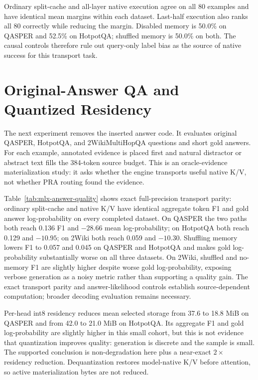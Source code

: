 \documentclass[10pt]{article}
\begin{document}
Ordinary split-cache and all-layer native execution agree on all 80 examples
and have identical mean margins within each dataset. Last-half execution also
ranks all 80 correctly while reducing the margin. Disabled memory is 50.0\% on
QASPER and 52.5\% on HotpotQA; shuffled memory is 50.0\% on both. The causal
controls therefore rule out query-only label bias as the source of native
success for this transport task.

\section{Original-Answer QA and Quantized Residency}
The next experiment removes the inserted answer code. It evaluates original
QASPER, HotpotQA, and 2WikiMultiHopQA questions and short gold answers. For each
example, annotated evidence is placed first and natural distractor or abstract
text fills the 384-token source budget. This is an oracle-evidence
materialization study: it asks whether the engine transports useful native K/V,
not whether PRA routing found the evidence.

\begin{table}[!htbp]
\centering
\scriptsize
\caption{Natural-QA generation with Qwen3-1.7B-4bit over five seeds. Strict EM
is zero because the model often continues after the answer; token F1 and total
gold-answer log-probability retain the useful quality signal.}

\label{tab:mlx-answer-quality}
\end{table}

Table~\ref{tab:mlx-answer-quality} shows exact full-precision transport parity:
ordinary split-cache and native K/V have identical aggregate token F1 and gold
answer log-probability on every completed dataset. On QASPER the two paths both
reach 0.136 F1 and $-28.66$ mean log-probability; on HotpotQA both reach 0.129
and $-10.95$; on 2Wiki both reach 0.059 and $-10.30$. Shuffling memory lowers
F1 to 0.057 and 0.045 on QASPER and HotpotQA and makes gold log-probability
substantially worse on all three datasets. On 2Wiki, shuffled and no-memory F1
are slightly higher despite worse gold log-probability, exposing verbose
generation as a noisy metric rather than supporting a quality gain. The exact
transport parity and answer-likelihood controls establish source-dependent
computation; broader decoding evaluation remains necessary.

Per-head int8 residency reduces mean selected storage from 37.6 to 18.8 MiB on
QASPER and from 42.0 to 21.0 MiB on HotpotQA. Its aggregate F1 and gold
log-probability are slightly higher in this small cohort, but this is not
evidence that quantization improves quality: generation is discrete and the
sample is small. The supported conclusion is non-degradation here plus a
near-exact $2\times$ residency reduction. Dequantization restores model-native
K/V before attention, so active materialization bytes are not reduced.
\end{document}
